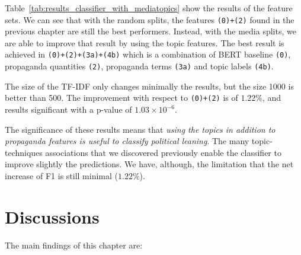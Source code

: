 Table~\ref{tab:results_classifier_with_mediatopics} show the results of the feature sets.
We can see that with the random splits, the features \texttt{(0)+(2)} found in the previous chapter are still the best performers.
Instead, with the media splits, we are able to improve that result by using the topic features.
The best result is achieved in \texttt{(0)+(2)+(3a)+(4b)} which is a combination of BERT baseline \texttt{(0)}, propaganda quantities \texttt{(2)}, propaganda terms \texttt{(3a)} and topic labels \texttt{(4b)}.

The size of the TF-IDF only changes minimally the results, but the size 1000 is better than 500.
The improvement with respect to \texttt{(0)+(2)} is of $1.22\%$, and results significant with a p-value of $1.03 \times 10^{-6}$.

%

The significance of these results means that \emph{using the topics in addition to propaganda features is useful to classify political leaning}. The many topic-techniques associations that we discovered previously enable the classifier to improve slightly the predictions.
%
We have, although, the limitation that the net increase of F1 is still minimal ($1.22\%$).

\section{\statusgreen Discussions}
\label{sec:topic_discussion}

The main findings of this chapter are:

